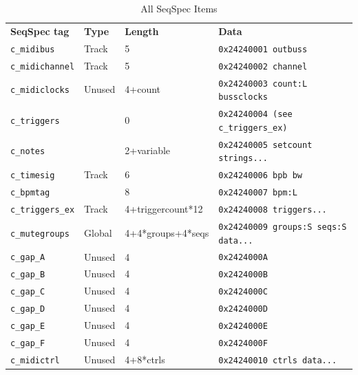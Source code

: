    \begin{table}[htb]
      \centering
      \caption{All SeqSpec Items}
      \label{table:seqspec_items_all}
      \begin{tabular}{l l l l}
         \textbf{SeqSpec tag}        & \textbf{Type} & \textbf{Length}   & \textbf{Data} \\
         \texttt{c\_midibus}         & Track         & 5                 & \texttt{0x24240001 outbuss} \\
         \texttt{c\_midichannel}     & Track         & 5                 & \texttt{0x24240002 channel} \\
         \texttt{c\_midiclocks}      & Unused        & 4+count           & \texttt{0x24240003 count:L bussclocks} \\
         \texttt{c\_triggers}        &               & 0                 & \texttt{0x24240004 (see c\_triggers\_ex)} \\
         \texttt{c\_notes}           &               & 2+variable        & \texttt{0x24240005 setcount strings...} \\
         \texttt{c\_timesig}         & Track         & 6                 & \texttt{0x24240006 bpb bw} \\
         \texttt{c\_bpmtag}          &               & 8                 & \texttt{0x24240007 bpm:L } \\
         \texttt{c\_triggers\_ex}    & Track         & 4+triggercount*12 & \texttt{0x24240008 triggers...} \\
         \texttt{c\_mutegroups}      & Global        & 4+4*groups+4*seqs & \texttt{0x24240009 groups:S seqs:S data...} \\
         \texttt{c\_gap\_A}          & Unused        & 4                 & \texttt{0x2424000A} \\
         \texttt{c\_gap\_B}          & Unused        & 4                 & \texttt{0x2424000B} \\
         \texttt{c\_gap\_C}          & Unused        & 4                 & \texttt{0x2424000C} \\
         \texttt{c\_gap\_D}          & Unused        & 4                 & \texttt{0x2424000D} \\
         \texttt{c\_gap\_E}          & Unused        & 4                 & \texttt{0x2424000E} \\
         \texttt{c\_gap\_F}          & Unused        & 4                 & \texttt{0x2424000F} \\
         \texttt{c\_midictrl}        & Unused        & 4+8*ctrls         & \texttt{0x24240010 ctrls data...} \\

\end{tabular}
\end{table}
